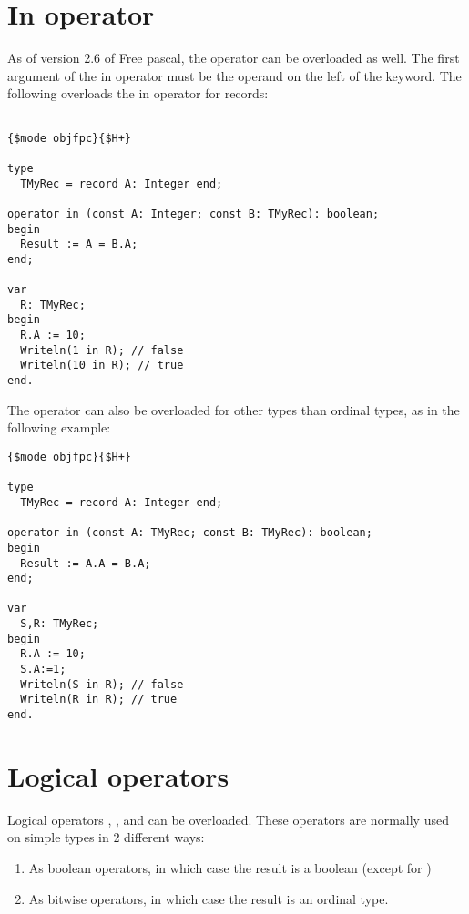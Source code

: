 \section{In operator}
As of version 2.6 of Free pascal, the  operator can be overloaded as well.
The first argument of the in operator must be the operand on the left of the
 keyword.
The following overloads the in operator for records:
\begin{verbatim}

{$mode objfpc}{$H+}

type
  TMyRec = record A: Integer end;

operator in (const A: Integer; const B: TMyRec): boolean;
begin
  Result := A = B.A;
end;

var
  R: TMyRec;
begin
  R.A := 10;
  Writeln(1 in R); // false
  Writeln(10 in R); // true
end.
\end{verbatim}
The  operator can also be overloaded for other types than ordinal
types, as in the following example:
\begin{verbatim}
{$mode objfpc}{$H+}

type
  TMyRec = record A: Integer end;

operator in (const A: TMyRec; const B: TMyRec): boolean;
begin
  Result := A.A = B.A;
end;

var 
  S,R: TMyRec;
begin
  R.A := 10;
  S.A:=1;
  Writeln(S in R); // false
  Writeln(R in R); // true
end.
\end{verbatim}

\section{Logical operators}
Logical operators , ,  and  can be overloaded.
These operators are normally used on simple types in 2 different ways:
\begin{enumerate}
\item As boolean operators, in which case the result is a boolean (except for )
\item As bitwise operators, in which case the result is an ordinal type.
\end{enumerate}

